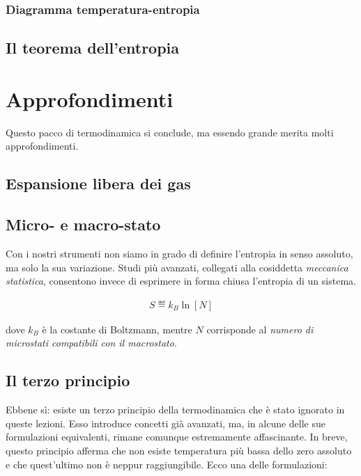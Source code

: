 \subsubsection*{Diagramma temperatura-entropia}







\subsection{Il teorema dell'entropia}









\section{Approfondimenti}
Questo pacco di termodinamica si conclude, ma essendo grande
merita molti approfondimenti.


\subsection{Espansione libera dei gas}

\subsection{Micro- e macro-stato}
Con i nostri strumenti non siamo in grado di definire l'entropia in
senso assoluto, ma solo la sua variazione. Studi più avanzati,
collegati alla cosiddetta \textit{meccanica statistica}, consentono
invece di esprimere in forma chiusa l'entropia di un sistema.

\begin{align}
    S \eqdef k_B \ln [N]\label{entropia_meccanica_statistica}
\end{align}

\noindent dove $k_B$ è la costante di Boltzmann, mentre $N$
corrisponde al \textit{numero di microstati compatibili con il
macrostato}.


\subsection{Il terzo principio}
Ebbene sì: esiste un terzo principio della termodinamica che è stato
ignorato in queste lezioni. Esso introduce concetti già avanzati, ma,
in alcune delle sue formulazioni equivalenti, rimane comunque estremamente
affascinante. In breve, questo principio afferma che non esiste
temperatura più bassa dello zero assoluto e che quest'ultimo non è
neppur raggiungibile. Ecco una delle formulazioni:

